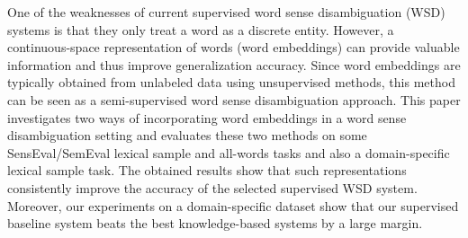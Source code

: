One of the weaknesses of current supervised word sense disambiguation (WSD) systems is that they only treat a word as a discrete entity. However, a continuous-space representation of words (word embeddings) can provide valuable information and thus improve generalization accuracy. Since word embeddings are typically obtained from unlabeled data using unsupervised methods, this method can be seen as a semi-supervised word sense disambiguation approach. This paper investigates two ways of incorporating word embeddings in a word sense disambiguation setting and evaluates these two methods on some SensEval/SemEval lexical sample and all-words tasks and also a domain-specific lexical sample task. The obtained results show that such representations consistently improve the accuracy of the selected supervised WSD system. Moreover, our experiments on a domain-specific dataset show that our supervised baseline system beats the best knowledge-based systems by a large margin.
